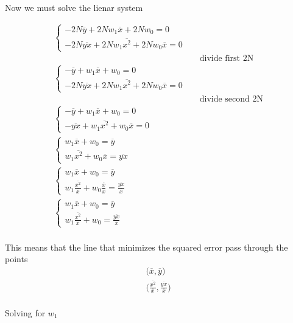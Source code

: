 \documentclass[10pt,a4paper]{article}
\newcommand*\mean[1]{\overline{#1}}
\begin{document}
	Now we must solve the lienar system
	
	\begin{align*}
		\begin{cases}
			-2N\mean{y}+2Nw_1\mean{x}+2Nw_0=0\\
			-2N\mean{yx}+2Nw_1\mean{x^2}+2Nw_0\mean{x}=0
		\end{cases}\\
		&& \text{divide first 2N}\\
		\begin{cases}
			-\mean{y}+w_1\mean{x}+w_0=0\\
			-2N\mean{yx}+2Nw_1\mean{x^2}+2Nw_0\mean{x}=0
		\end{cases}\\
		&& \text{divide second 2N}\\
		\begin{cases}
			-\mean{y}+w_1\mean{x}+w_0=0\\
			-\mean{yx}+w_1\mean{x^2}+w_0\mean{x}=0
		\end{cases}\\
		\begin{cases}
			w_1\mean{x}+w_0=\mean{y}\\
			w_1\mean{x^2}+w_0\mean{x}=\mean{yx}
		\end{cases}\\
		\begin{cases}
			w_1\mean{x}+w_0=\mean{y}\\
			w_1\frac{\mean{x^2}}{\mean{x}}+w_0\frac{\mean{x}}{\mean{x}}=\frac{\mean{yx}}{\mean{x}}
		\end{cases}\\
		\begin{cases}
		w_1\mean{x}+w_0=\mean{y}\\
		w_1\frac{\mean{x^2}}{\mean{x}}+w_0=\frac{\mean{yx}}{\mean{x}}
		\end{cases}\\
	\end{align*}
	
	This means that the line that minimizes the squared error pass through the points
	\begin{align*}
		\big(\mean{x},\mean{y}\big)\\
		\big(\frac{\mean{x^2}}{\mean{x}},\frac{\mean{yx}}{\mean{x}}\big)\\
	\end{align*}
	
	Solving for $w_1$
	
\end{document}

